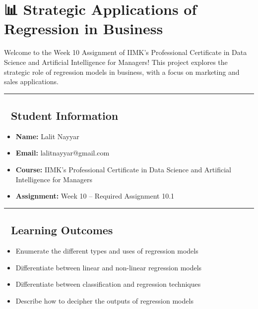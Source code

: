 \section{📊 Strategic Applications of Regression in
Business}\label{strategic-applications-of-regression-in-business}

Welcome to the Week 10 Assignment of IIMK's Professional Certificate in
Data Science and Artificial Intelligence for Managers! This project
explores the strategic role of regression models in business, with a
focus on marketing and sales applications.

\begin{center}\rule{0.5\linewidth}{0.5pt}\end{center}

\subsection{👤 Student Information}\label{student-information}

\begin{itemize}
\tightlist
\item
  \textbf{Name:} Lalit Nayyar
\item
  \textbf{Email:} lalitnayyar@gmail.com
\item
  \textbf{Course:} IIMK's Professional Certificate in Data Science and
  Artificial Intelligence for Managers
\item
  \textbf{Assignment:} Week 10 -- Required Assignment 10.1
\end{itemize}

\begin{center}\rule{0.5\linewidth}{0.5pt}\end{center}

\subsection{🎯 Learning Outcomes}\label{learning-outcomes}

\begin{itemize}
\tightlist
\item
  Enumerate the different types and uses of regression models
\item
  Differentiate between linear and non-linear regression models
\item
  Differentiate between classification and regression techniques
\item
  Describe how to decipher the outputs of regression models
\end{itemize}

